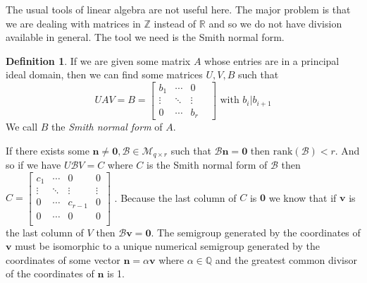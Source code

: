 \documentclass[11pt]{amsart}
\theoremstyle{plain}
\theoremstyle{definition}
\newtheorem{defi}{Definition}
\begin{document}
The usual tools of linear algebra are not useful here. The major problem is that we are dealing with matrices in $\mathbb{Z}$ instead of $\mathbb{R}$ and so we do not have division available in general. The tool we need is the Smith normal form.
\begin{defi}
  If we are given some matrix $A$ whose entries are in a principal ideal domain,
  then we can find some matrices $U,V,B$ such that
\[UAV=B=
\left[\begin{array}{cccc}
  b_1&\cdots&0\\
  \vdots&\ddots&\vdots \\
  0&\cdots&b_r&
\end{array}\right]
\text{ with }b_i|b_{i+1}\]
We call $B$ the \emph{Smith normal form} of $A$.\cite{adkins}
\end{defi}
If there exists some $\mathbf{n}\ne \mathbf{0}, \mathcal{B}\in \mathcal{M}_{q\times r}$ such that $\mathcal{B}\mathbf{n}=\mathbf{0}$ then $\text{rank}(\mathcal{B})<r$. And so if we have $U\mathcal{B}V=C$ where $C$ is the Smith normal form of $\mathcal{B}$ then $C=\left[\begin{array}{ccccc}
  c_1&\cdots&0&0\\
  \vdots&\ddots&\vdots&\vdots \\
  0&\cdots&c_{r-1}&0\\
  0&\cdots&0&0\\
\end{array}\right]
$
. Because the last column of $C$ is $\mathbf{0}$ we know that if $\mathbf{v}$ is the last column of $V$ then $\mathcal{B}\mathbf{v}=\mathbf{0}$. The semigroup generated by the coordinates of $\mathbf{v}$ must be isomorphic to a unique numerical semigroup generated by the coordinates of some vector $\mathbf{n}=\alpha\mathbf{v}$ where $\alpha\in \mathbb{Q}$ and the greatest common divisor of the coordinates of $\mathbf{n}$ is 1.
\end{document}
